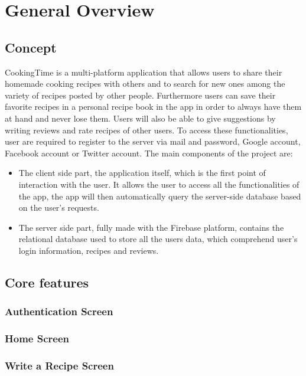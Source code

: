 \chapter{General Overview}

\section{Concept}
CookingTime is a multi-platform application that allows users to share their homemade cooking recipes with others and to search for new ones among the variety of recipes posted by other people.
Furthermore users can save their favorite recipes in a personal recipe book in the app in order to always have them at hand and never lose them.
Users will also be able to give suggestions by writing reviews and rate recipes of other users.
To access these functionalities, user are required to register to the server via mail and password, Google account, Facebook account or Twitter account.
The main components of the project are:
\begin{itemize}
	\item The client side part, the application itself, which is the first point of interaction with the user.
	It allows the user to access all the functionalities of the app, the app will then automatically query the server-side database based on the user's requests.
	\item The server side part, fully made with the Firebase platform, contains the relational database used to store all the users data, which comprehend user's login information, recipes and reviews.
\end{itemize}

\section{Core features}
\subsection{Authentication Screen}

\subsection{Home Screen}

\subsection{Write a Recipe Screen}

